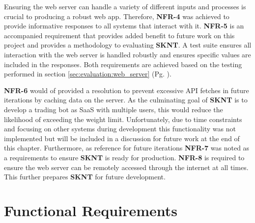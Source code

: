 Ensuring the web server can handle a variety of different inputs and processes is crucial to producing a robust web app. Therefore, \textbf{NFR-4} was achieved to provide informative responses to all systems that interact with it. \textbf{NFR-5} is an accompanied requirement that provides added benefit to future work on this project and provides a methodology to evaluating \textbf{SKNT}. A test suite ensures all interaction with the web server is handled robustly and ensures specific values are included in the responses. Both requirements are achieved based on the testing performed in section \ref{sec:evaluation:web_server} (Pg. \pageref{sec:evaluation:web_server}).

\textbf{NFR-6} would of provided a resolution to prevent excessive API fetches in future iterations by caching data on the server. As the culminating goal of \textbf{SKNT} is to develop a trading bot as SaaS with multiple users, this would reduce the likelihood of exceeding the weight limit. Unfortunately, due to time constraints and focusing on other systems during development this functionality was not implemented but will be included in a discussion for future work at the end of this chapter. Furthermore, as reference for future iterations\textbf{ NFR-7} was noted as a requirements to ensure \textbf{SKNT} is ready for production. \textbf{NFR-8} is required to ensure the web server can be remotely accessed through the internet at all times. This further prepares \textbf{SKNT} for future development.



\section{Functional Requirements}
\label{sec:requirements:unc}



